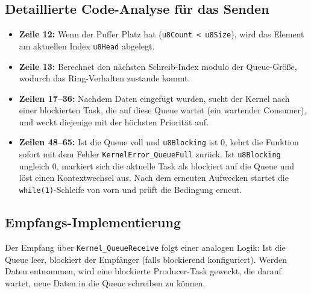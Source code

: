 \subsection{Detaillierte Code-Analyse für das Senden}
\begin{itemize}
    \item \textbf{Zeile 12:} Wenn der Puffer Platz hat (\lstinline|u8Count < u8Size|), wird das Element am aktuellen Index \lstinline|u8Head| abgelegt.
    \item \textbf{Zeile 13:} Berechnet den nächsten Schreib-Index modulo der Queue-Größe, wodurch das Ring-Verhalten zustande kommt.
    \item \textbf{Zeilen 17--36:} Nachdem Daten eingefügt wurden, sucht der Kernel nach einer blockierten Task, die auf diese Queue wartet (ein wartender Consumer), und weckt diejenige mit der höchsten Priorität auf.
    \item \textbf{Zeilen 48--65:} Ist die Queue voll und \lstinline|u8Blocking| ist 0, kehrt die Funktion sofort mit dem Fehler \lstinline|KernelError_QueueFull| zurück. Ist \lstinline|u8Blocking| ungleich 0, markiert sich die aktuelle Task als blockiert auf die Queue und löst einen Kontextwechsel aus. Nach dem erneuten Aufwecken startet die \lstinline|while(1)|-Schleife von vorn und prüft die Bedingung erneut.
\end{itemize}

\subsection{Empfangs-Implementierung}
Der Empfang über \lstinline|Kernel_QueueReceive| folgt einer analogen Logik: Ist die Queue leer, blockiert der Empfänger (falls blockierend konfiguriert). Werden Daten entnommen, wird eine blockierte Producer-Task geweckt, die darauf wartet, neue Daten in die Queue schreiben zu können.

